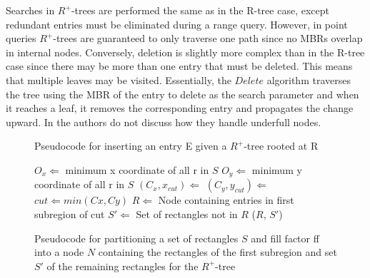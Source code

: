 Searches in $R^{+}$-trees are performed the same as in the R-tree case, except
redundant entries must be eliminated during a range query. However, in point queries
$R^{+}$-trees are guaranteed to only traverse one path since no MBRs overlap in 
internal nodes. Conversely, deletion is slightly more complex than in the R-tree case
since there may be more than one entry that must be deleted. This means that multiple 
leaves may be visited. Essentially, the $Delete$ algorithm traverses the tree using
the MBR of the entry to delete as the search parameter and when it reaches a leaf, it 
removes the corresponding entry and propagates the change upward. In 
\cite{DBLP:conf/vldb/87} the authors do not discuss how they handle underfull nodes.

\begin{figure}
\begin{algorithmic}
					\State {}
				\EndIf
			\EndFor
		\Else
				\State {}
			\Else
			\EndIf
		\EndIf
	\EndFunction
\end{algorithmic}
\caption{Pseudocode for inserting an entry E given a $R^{+}$-tree rooted at R}
\label{fig:R+_Tree_Insert}
\end{figure}

\begin{figure}
\begin{algorithmic}
		\EndIf
		\State $O_{x} \Leftarrow$ minimum x coordinate of all r in $S$
		\State $O_{y} \Leftarrow$ minimum y coordinate of all r in $S$
		\State $(C_{x}, x_{cut}) \Leftarrow$ 
		\State $(C_{y}, y_{cut}) \Leftarrow$ 
		\State $cut \Leftarrow min(Cx, Cy)$
		\State $R \Leftarrow$ Node containing entries in first subregion of cut
		\State $S' \Leftarrow$ Set of rectangles not in $R$ 
		\Return ($R$, $S'$)
	\EndFunction
\end{algorithmic}
\caption{Pseudocode for partitioning a set of rectangles $S$ and fill factor ff into
	a node $N$ containing the rectangles of the first subregion and set $S'$ of
	the remaining rectangles for the $R^{+}$-tree}
\label{fig:R+_Tree_Partition}
\end{figure}

